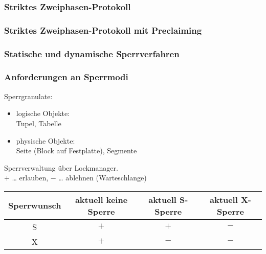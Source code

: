 \subsubsection*{Striktes Zweiphasen-Protokoll}
\subsubsection*{Striktes Zweiphasen-Protokoll mit Preclaiming}
\subsubsection{Statische und dynamische Sperrverfahren}
\subsubsection{Anforderungen an Sperrmodi}
Sperrgranulate:
\begin{itemize}
\item logische Objekte:\\
Tupel, Tabelle
\item physische Objekte:\\
Seite (Block auf Festplatte), Segmente 
\end{itemize}
Sperrverwaltung über Lockmanager.\\
$+$ … erlauben, $-$ … ablehnen (Warteschlange)\\
\begin{tabular}{c | c | c | c}
Sperrwunsch & aktuell keine Sperre & aktuell S-Sperre & aktuell X-Sperre\\\hline
S & $+$ & $+$ & $-$\\
X & $+$ & $-$ & $-$
\end{tabular}
